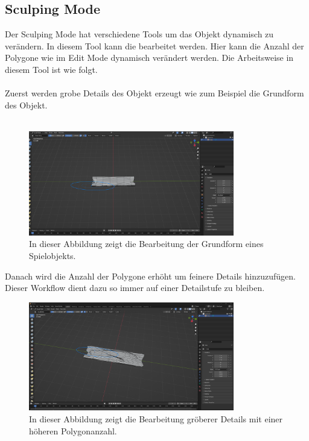 \subsection{Sculping Mode}
Der Sculping Mode hat verschiedene Tools um das Objekt dynamisch zu verändern. In diesem Tool kann die  bearbeitet werden. Hier kann die Anzahl der Polygone wie im Edit Mode dynamisch verändert werden. Die Arbeitsweise in diesem Tool ist wie folgt.\\\\
Zuerst werden grobe Details des Objekt erzeugt wie zum Beispiel die Grundform des Objekt.\\\\
\begin{figure}[H]
    \centering
    \includegraphics[width=0.8\textwidth]{chapters/13/images/HolzBrett.png}
    \caption{In dieser Abbildung zeigt die Bearbeitung der Grundform eines Spielobjekts.}
    \label{UST-14}
\end{figure}
\noindent Danach wird die Anzahl der Polygone erhöht um feinere Details hinzuzufügen. Dieser Workflow dient dazu so immer auf einer Detailstufe zu bleiben.
\begin{figure}[H]
    \centering
    \includegraphics[width=0.8\textwidth]{chapters/13/images/HolzBrett1.png}
    \caption{In dieser Abbildung zeigt die Bearbeitung gröberer Details mit einer höheren Polygonanzahl.}
    \label{UST-15}
\end{figure}
